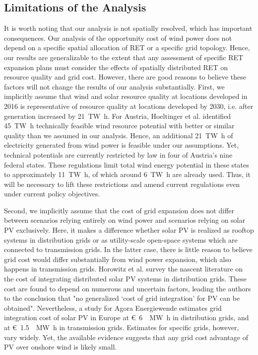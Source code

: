 \documentclass[review, 3p, times, 12pt]{elsarticle} %
\begin{document}
\subsection{Limitations of the Analysis}
It is worth noting that our analysis is not spatially resolved, which has important consequences.
Our analysis of the opportunity cost of wind power does not depend on a specific spatial allocation of RET or a specific grid topology. Hence, our results are generalizable to the extent that any assessment of specific RET expansion plans must consider the effects of spatially distributed RET on resource quality and grid cost.
However, there are good reasons to believe these factors will not change the results of our analysis substantially.
First, we implicitly assume that wind and solar resource quality at locations developed in 2016 is representative of resource quality at locations developed by 2030, i.e. after generation increased by \SI{21}{\tera\watt\hour}.
For Austria, Hoeltinger et al. \cite{Hoeltinger2016}  identified \SI{45}{\tera\watt\hour} technically feasible wind resource potential with better or similar quality than we assumed in our analysis.
Hence, an additional \SI{21}{\tera\watt\hour} of electricity generated from wind power is feasible under our assumptions.
Yet, technical potentials are currently restricted by law in four of Austria's nine federal states.
These regulations limit total wind energy potential in these states to approximately \SI{11}{\tera\watt\hour}, of which around \SI{6}{\tera\watt\hour} are already used.
Thus, it will be necessary to lift these restrictions and amend current regulations even under current policy objectives.

Second, we implicitly assume that the cost of grid expansion does not differ between scenarios relying entirely on wind power and scenarios relying on solar PV exclusively.
Here, it makes a difference whether solar PV is realized as rooftop systems in distribution grids or as utility-scale open-space systems which are connected to transmission grids.
In the latter case, there is little reason to believe grid cost would differ substantially from wind power expansion, which also happens in transmission grids.
Horowitz et al. \cite{Horowitz2018} survey the nascent literature on the cost of integrating distributed solar PV systems in distribution grids.
These cost are found to depend on numerous and uncertain factors, leading the authors to the conclusion that "no generalized `cost of grid integration' for PV can be obtained".
Nevertheless, a study for Agora Energiewende \cite{Fuerstenwerth2015} estimates grid integration cost of solar PV in Europe at \SI{6}[\euro]{\per\mega\watt\hour} in distribution grids, and at \SI{1.5}[\euro]{\per\mega\watt\hour} in transmission grids. Estimates for specific grids, however, vary widely.
Yet, the available evidence suggests that any grid cost advantage of PV over onshore wind is likely small.
\end{document}
